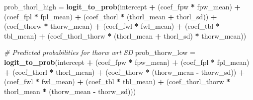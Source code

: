 \documentclass[
]{article}
\newenvironment{Shaded}{\begin{snugshade}}{\end{snugshade}}
\newcommand{\CommentTok}[1]{\textcolor[rgb]{0.56,0.35,0.01}{\textit{#1}}}
\newcommand{\FunctionTok}[1]{\textcolor[rgb]{0.13,0.29,0.53}{\textbf{#1}}}
\newcommand{\NormalTok}[1]{#1}
\newcommand{\OtherTok}[1]{\textcolor[rgb]{0.56,0.35,0.01}{#1}}
\newcommand{\SpecialCharTok}[1]{\textcolor[rgb]{0.81,0.36,0.00}{\textbf{#1}}}
\begin{document}
\begin{Shaded}
\begin{Highlighting}[]
\NormalTok{prob\_thorl\_high }\OtherTok{=} \FunctionTok{logit\_to\_prob}\NormalTok{(intercept }\SpecialCharTok{+} 
\NormalTok{                                 (coef\_fpw }\SpecialCharTok{*}\NormalTok{ fpw\_mean) }\SpecialCharTok{+} 
\NormalTok{                                 (coef\_fpl }\SpecialCharTok{*}\NormalTok{ fpl\_mean) }\SpecialCharTok{+} 
\NormalTok{                                 (coef\_thorl }\SpecialCharTok{*}\NormalTok{ (thorl\_mean }\SpecialCharTok{+}\NormalTok{ thorl\_sd)) }\SpecialCharTok{+} 
\NormalTok{                                 (coef\_thorw }\SpecialCharTok{*}\NormalTok{ thorw\_mean) }\SpecialCharTok{+} 
\NormalTok{                                 (coef\_fwl }\SpecialCharTok{*}\NormalTok{ fwl\_mean) }\SpecialCharTok{+} 
\NormalTok{                                 (coef\_tbl }\SpecialCharTok{*}\NormalTok{ tbl\_mean) }\SpecialCharTok{+} 
\NormalTok{                                 (coef\_thorl\_thorw }\SpecialCharTok{*}\NormalTok{ (thorl\_mean }\SpecialCharTok{+}\NormalTok{ thorl\_sd) }\SpecialCharTok{*}\NormalTok{ thorw\_mean))}

\CommentTok{\# Predicted probabilities for thorw wrt SD}
\NormalTok{prob\_thorw\_low }\OtherTok{=} \FunctionTok{logit\_to\_prob}\NormalTok{(intercept }\SpecialCharTok{+} 
\NormalTok{                                (coef\_fpw }\SpecialCharTok{*}\NormalTok{ fpw\_mean) }\SpecialCharTok{+} 
\NormalTok{                                (coef\_fpl }\SpecialCharTok{*}\NormalTok{ fpl\_mean) }\SpecialCharTok{+} 
\NormalTok{                                (coef\_thorl }\SpecialCharTok{*}\NormalTok{ thorl\_mean) }\SpecialCharTok{+} 
\NormalTok{                                (coef\_thorw }\SpecialCharTok{*}\NormalTok{ (thorw\_mean }\SpecialCharTok{{-}}\NormalTok{ thorw\_sd)) }\SpecialCharTok{+} 
\NormalTok{                                (coef\_fwl }\SpecialCharTok{*}\NormalTok{ fwl\_mean) }\SpecialCharTok{+} 
\NormalTok{                                (coef\_tbl }\SpecialCharTok{*}\NormalTok{ tbl\_mean) }\SpecialCharTok{+} 
\NormalTok{                                (coef\_thorl\_thorw }\SpecialCharTok{*}\NormalTok{ thorl\_mean }\SpecialCharTok{*}\NormalTok{ (thorw\_mean }\SpecialCharTok{{-}}\NormalTok{ thorw\_sd)))}


\end{Highlighting}
\end{Shaded}
\end{document}
